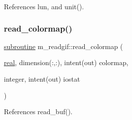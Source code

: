 References lun, and unit().

\mbox{\label{namespacem__readgif_aabaf13dcb1e665b2524049e5661ca4b6}} 
\subsubsection{\texorpdfstring{read\+\_\+colormap()}{read\_colormap()}}
{\footnotesize\ttfamily \hyperlink{M__stopwatch_83_8txt_acfbcff50169d691ff02d4a123ed70482}{subroutine} m\+\_\+readgif\+::read\+\_\+colormap (\begin{DoxyParamCaption}\item[{\hyperlink{read__watch_83_8txt_abdb62bde002f38ef75f810d3a905a823}{real}, dimension(\+:,\+:), intent(out)}]{colormap,  }\item[{integer, intent(out)}]{iostat }\end{DoxyParamCaption})\hspace{0.3cm}{\ttfamily [private]}}



References read\+\_\+buf().

\mbox{\label{namespacem__readgif_a4af978d944dbefb3ddeb81cd8c54d0f9}} 
